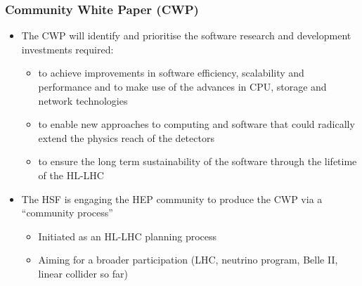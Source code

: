 \begin{frame}
\frametitle{Community White Paper (CWP)}

\begin{itemize}
\item The CWP will identify and prioritise the software research and development investments required:
   \begin{itemize} 
   \item to achieve improvements in software efficiency, scalability and performance and to make use of the advances in CPU, storage and network technologies
   \item to enable new approaches to computing and software that could radically extend the physics reach of the detectors
   \item to ensure the long term sustainability of the software through the lifetime of the HL-LHC
   \end{itemize} 
\vskip 0.15in
\item The HSF is engaging the HEP community to produce the CWP via a ``community process''
   \begin{itemize} 
   \item Initiated as an HL-LHC planning process
   \item Aiming for a broader participation (LHC, neutrino program, Belle II, linear collider so far)
   \end{itemize} 
\end{itemize}

\end{frame}


